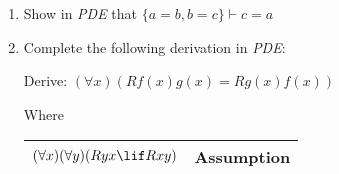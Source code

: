 \documentclass[12pt,letterpaper]{article}
\begin{document}
\begin{enumerate}
    \item
      Show in \textit{PDE} that
      $\{a = b, b = c\} \vdash c = a$

    \item
      Complete the following derivation in \textit{PDE}:

      Derive: $(\forall x)(Rf(x)g(x) = Rg(x)f(x))$

      Where

      \begin{tabular}{l l}
        $(\forall x)(\forall y)(Ryx \lif Rxy)$ & \quad Assumption \\
        \hline
      \end{tabular}
  \end{enumerate}
\end{document}
